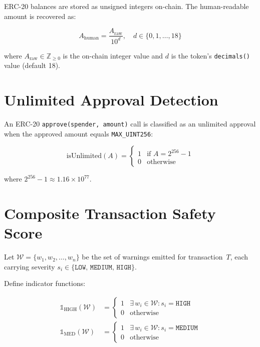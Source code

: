 \documentclass{article}
\begin{document}
ERC-20 balances are stored as unsigned integers on-chain. The human-readable
amount is recovered as:

\begin{equation}
  A_{\text{human}} = \frac{A_{\text{raw}}}{10^{d}}, \quad d \in \{0, 1, \ldots, 18\}
\end{equation}

where \(A_{\text{raw}} \in \mathbb{Z}_{\geq 0}\) is the on-chain integer value
and \(d\) is the token's \texttt{decimals()} value (default 18).

\section{Unlimited Approval Detection}

An ERC-20 \texttt{approve(spender, amount)} call is classified as an unlimited
approval when the approved amount equals \texttt{MAX\_UINT256}:

\begin{equation}
  \text{isUnlimited}(A) =
  \begin{cases}
    1 & \text{if } A = 2^{256} - 1 \\
    0 & \text{otherwise}
  \end{cases}
\end{equation}

\noindent where \(2^{256} - 1 \approx 1.16 \times 10^{77}\).

\section{Composite Transaction Safety Score}

Let \(\mathcal{W} = \{w_1, w_2, \ldots, w_n\}\) be the set of warnings emitted
for transaction~\(T\), each carrying severity
\(s_i \in \{\texttt{LOW},\, \texttt{MEDIUM},\, \texttt{HIGH}\}\).

Define indicator functions:

\begin{align}
  \mathbb{1}_{\text{HIGH}}(\mathcal{W}) &=
  \begin{cases}
    1 & \exists\, w_i \in \mathcal{W} : s_i = \texttt{HIGH} \\
    0 & \text{otherwise}
  \end{cases} \\[6pt]
  \mathbb{1}_{\text{MED}}(\mathcal{W}) &=
  \begin{cases}
    1 & \exists\, w_i \in \mathcal{W} : s_i = \texttt{MEDIUM} \\
    0 & \text{otherwise}
  \end{cases}
\end{align}
\end{document}
